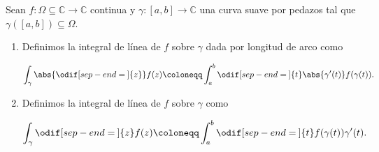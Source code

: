 \documentclass[../main.tex]{subfiles}
\begin{document}
\begin{definition}
    Sean \(f \colon \Omega \subseteq \mathbb{C} \to \mathbb{C}\) continua y \(\gamma
    \colon [a, b] \to \mathbb{C}\) una curva suave por pedazos tal que \(\gamma([a,b])
    \subseteq \Omega\).

    \begin{enumerate}
        \item Definimos la integral de línea de \(f\) sobre \(\gamma\) dada por longitud
            de arco como

            \begin{equation}
                \int_{\gamma} \abs{\odif[sep-end=\medspace]{z}} f(z) \coloneqq
                \int_{a}^{b}\odif[sep-end=\medspace]{t} \abs{\gamma^{\prime}(t)}
                f(\gamma(t)).
            \end{equation}
        \item Definimos la integral de línea de \(f\) sobre \(\gamma\) como

            \begin{equation}
                \int_{\gamma}\odif[sep-end=\medspace]{z} f(z) \coloneqq
                \int_{a}^{b}\odif[sep-end=\medspace]{t} f(\gamma(t))\gamma^{\prime}(t).
            \end{equation}
    \end{enumerate}
\end{definition}
\end{document}
